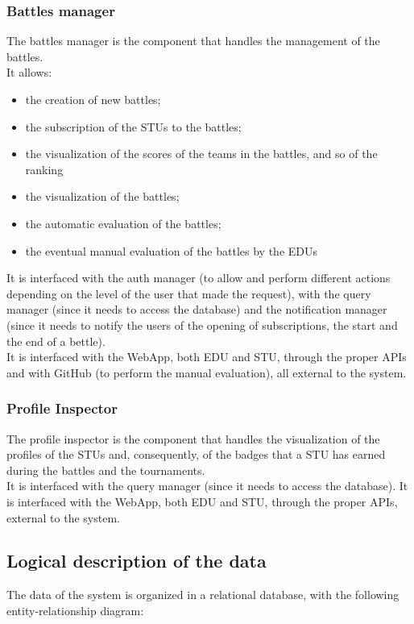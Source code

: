 \subsubsection*{Battles manager}
The battles manager is the component that handles the management of the battles.\\
It allows:
\begin{itemize}
    \item the creation of new battles;
    \item the subscription of the STUs to the battles;
    \item the visualization of the scores of the teams in the battles, and so of the ranking
    \item the visualization of the battles;
    \item the automatic evaluation of the battles;
    \item the eventual manual evaluation of the battles by the EDUs
\end{itemize}
It is interfaced with the auth manager (to allow and perform different actions depending on the level of the user that made the request), with the query manager (since it needs to access the database) and the notification manager (since it needs to notify the users of the opening of subscriptions, the start and the end of a bettle).\\
It is interfaced with the WebApp, both EDU and STU, through the proper APIs and with GitHub (to perform the manual evaluation), all external to the system.

\subsubsection*{Profile Inspector}
The profile inspector is the component that handles the visualization of the profiles of the STUs and, consequently, of the badges that a STU has earned during the battles and the tournaments.\\
It is interfaced with the query manager (since it needs to access the database).
It is interfaced with the WebApp, both EDU and STU, through the proper APIs, external to the system.

\subsection{Logical description of the data}
The data of the system is organized in a relational database, with the following entity-relationship diagram:

